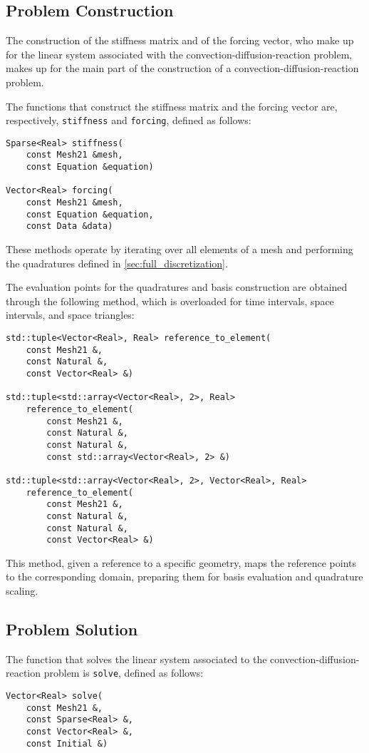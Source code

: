 \newpage
\subsection{Problem Construction}

The construction of the stiffness matrix and of the forcing vector, who make up for the linear system associated with the convection-diffusion-reaction problem, makes up for the main part of the construction of a convection-diffusion-reaction problem.

The functions that construct the stiffness matrix and the forcing vector are, respectively, \lstinline{stiffness} and \lstinline{forcing}, defined as follows:
\begin{lstlisting}[style=cpp]
Sparse<Real> stiffness(
    const Mesh21 &mesh, 
    const Equation &equation)

Vector<Real> forcing(
    const Mesh21 &mesh, 
    const Equation &equation, 
    const Data &data)
\end{lstlisting}
These methods operate by iterating over all elements of a mesh and performing the quadratures defined in \cref{sec:full_discretization}.

The evaluation points for the quadratures and basis construction are obtained through the following method, which is overloaded for time intervals, space intervals, and space triangles:
\begin{lstlisting}[style=cpp]
std::tuple<Vector<Real>, Real> reference_to_element(
    const Mesh21 &, 
    const Natural &, 
    const Vector<Real> &)

std::tuple<std::array<Vector<Real>, 2>, Real> 
    reference_to_element(
        const Mesh21 &, 
        const Natural &, 
        const Natural &, 
        const std::array<Vector<Real>, 2> &)

std::tuple<std::array<Vector<Real>, 2>, Vector<Real>, Real> 
    reference_to_element(
        const Mesh21 &, 
        const Natural &, 
        const Natural &, 
        const Vector<Real> &)
\end{lstlisting}
This method, given a reference to a specific geometry, maps the reference points to the corresponding domain, preparing them for basis evaluation and quadrature scaling.

\newpage
\subsection{Problem Solution}

The function that solves the linear system associated to the convection-diffusion-reaction problem is \lstinline{solve}, defined as follows:
\begin{lstlisting}[style=cpp]
Vector<Real> solve(
    const Mesh21 &, 
    const Sparse<Real> &, 
    const Vector<Real> &, 
    const Initial &)
\end{lstlisting}

